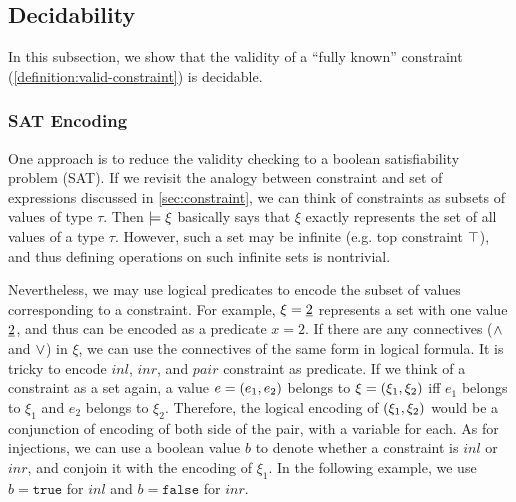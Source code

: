 \subsection{Decidability}
\label{sec:decidability}
In this subsection, we show that the validity of a ``fully known'' constraint (\autoref{definition:valid-constraint}) is decidable.



\subsubsection{SAT Encoding}
 One approach is to reduce the validity checking to a boolean satisfiability problem (SAT). 
If we revisit the analogy between constraint and set of expressions discussed in \autoref{sec:constraint}, we can think of constraints as subsets of values of type $\tau$.
Then $\models \xi$ basically says that $\xi$ exactly represents the set of all values of a type $\tau$. 
However, such a set may be infinite (e.g. top constraint $\top$),
and thus defining operations on such infinite sets is nontrivial. 

Nevertheless, we may use logical predicates to encode the subset of values corresponding to a constraint. 
For example, $\xi=\underline{2}$ represents a set with one value $\underline{2}$, and thus can be encoded as a predicate $x=2$. 
If there are any connectives ($\wedge$ and $\vee$) in $\xi$, we can use the connectives of the same form in logical formula. 
It is tricky to encode $inl$, $inr$, and $pair$ constraint as predicate. 
If we think of a constraint as a set again, a value $e=(e_1 , e_2)$ belongs to $\xi=(\xi_1 , \xi_2)$ iff $e_1$ belongs to $\xi_1$ and $e_2$ belongs to $\xi_2$. 
Therefore, the logical encoding of $(\xi_1 , \xi_2)$ would be a conjunction of encoding of both side of the pair, with a variable for each.
As for injections, we can use a boolean value $b$ to denote whether a constraint is $inl$ or $inr$, and conjoin it with the encoding of $\xi_1$. In the following example, we use $b=\mathtt{true}$ for $inl$ and $b=\mathtt{false}$ for $inr$.

